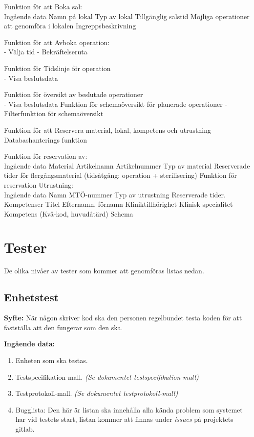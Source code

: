 \documentclass[a4paper,10pt]{article}
\begin{document}
Funktion för att Boka sal: \\
Ingående data
Namn på lokal
Typ av lokal
Tillgänglig salstid
Möjliga operationer att genomföra i lokalen
Ingreppsbeskrivning

Funktion för att Avboka operation: \\
-	Välja tid
-	Bekräftelseruta

Funktion för Tidslinje för operation \\
-	Visa beslutsdata

Funktion för översikt av beslutade operationer \\
-	Visa beslutsdata
Funktion för schemaöversikt för planerade operationer
-	Filterfunktion för schemaöversikt

Funktion för att Reservera material, lokal, kompetens och utrustning \\
Databashanterings funktion

Funktion för reservation av: \\
Ingående data
	Material
	Artikelnamn
	Artikelnummer
	Typ av material
	Reserverade tider för flergångsmaterial (tidsåtgång: operation + sterilisering)
Funktion för reservation Utrustning: \\
Ingående data
	Namn
	MTÖ-nummer
	Typ av utrustning
	Reserverade tider.
Kompetenser
Titel
Efternamn, förnamn
Kliniktillhörighet
Klinisk specialitet
Kompetens (Kvå-kod, huvudåtärd)
Schema


\section{Tester}
De olika nivåer av tester som kommer att genomföras listas nedan.
\subsection{Enhetstest}
\label{sec:Enhetstest}
  \textbf{Syfte:}
  När någon skriver kod ska den personen regelbundet testa koden för att fastställa att den fungerar som den ska.

  \textbf{Ingående data:}
        \begin{enumerate}
            \item Enheten som ska testas.
            \item Testspecifikation-mall. \emph{(Se dokumentet testspecifikation-mall)}
            \item Testprotokoll-mall. \emph{(Se dokumentet testprotokoll-mall)}
            \item Bugglista: Den här är listan ska innehålla alla kända problem som systemet har vid testets start, listan kommer att finnas under \emph{issues} på projektets gitlab.
        \end{enumerate}
\end{document}
